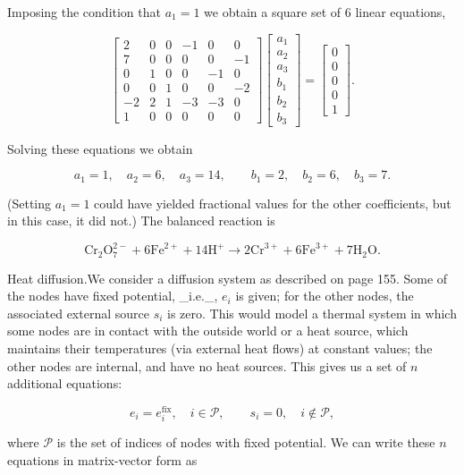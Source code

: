 
Imposing the condition that \(a_{1}=1\) we obtain a square set of 6 linear equations,

\[\left[\begin{array}{rrrrrr}2&0&0&-1&0&0\\ 7&0&0&0&0&-1\\ 0&1&0&0&-1&0\\ 0&0&1&0&0&-2\\ -2&2&1&-3&-3&0\\ 1&0&0&0&0&0\end{array}\right]\left[\begin{array}{c}a_{1}\\ a_{2}\\ a_{3}\\ b_{1}\\ b_{2}\\ b_{3}\end{array}\right]=\left[\begin{array}{c}0\\ 0\\ 0\\ 0\\ 1\end{array}\right].\]

Solving these equations we obtain

\[a_{1}=1,\quad a_{2}=6,\quad a_{3}=14,\qquad b_{1}=2,\quad b_{2}=6,\quad b_{3}=7.\]

(Setting \(a_{1}=1\) could have yielded fractional values for the other coefficients, but in this case, it did not.) The balanced reaction is

\[\mathrm{Cr}_{2}\mathrm{O}_{7}^{2-}+6\mathrm{Fe}^{2+}+14\mathrm{H}^{+} \longrightarrow 2\mathrm{Cr}^{3+}+6\mathrm{Fe}^{3+}+7\mathrm{H}_{2}\mathrm{O}.\]

Heat diffusion.We consider a diffusion system as described on page 155. Some of the nodes have fixed potential, _i.e._, \(e_{i}\) is given; for the other nodes, the associated external source \(s_{i}\) is zero. This would model a thermal system in which some nodes are in contact with the outside world or a heat source, which maintains their temperatures (via external heat flows) at constant values; the other nodes are internal, and have no heat sources. This gives us a set of \(n\) additional equations:

\[e_{i}=e_{i}^{\mathrm{fix}},\quad i\in\mathcal{P},\qquad s_{i}=0,\quad i\not \in\mathcal{P},\]

where \(\mathcal{P}\) is the set of indices of nodes with fixed potential. We can write these \(n\) equations in matrix-vector form as


